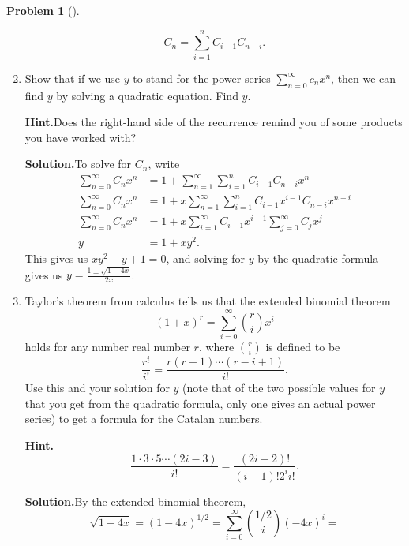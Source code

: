 \documentclass[10pt,]{book}
\theoremstyle{plain}
\theoremstyle{definition}
\newtheorem{activity}[project]{Problem}
\theoremstyle{definition}
\numberwithin{equation}{chapter}
\newcommand{\amp}{&}
\begin{document}
\begin{activity}[]
\begin{enumerate}[font=\bfseries,label=(\alph*),ref=\alph*]
\begin{equation*}
C_n=\sum_{i=1}^nC_{i-1}C_{n-i}\text{.}
\end{equation*}
%
\item\label{task-162} Show that if we use \(y\) to stand for the power series \(\sum_{n=0}^\infty c_nx^n\), then we can find \(y\) by solving a quadratic equation. Find \(y\).%
\par\medskip\noindent%
\textbf{Hint.}\quad Does the right-hand side of the recurrence remind you of some products you have worked with?%
\par\medskip\noindent%
\textbf{Solution.}\quad To solve for \(C_n\), write%
\begin{align*}
\sum_{n=0}^\infty C_nx^n \amp= 1+\sum_{n=1}^\infty\sum_{i=1}^nC_{i-1}C_{n-i}x^n\\
\sum_{n=0}^\infty C_nx^n
\amp= 1+x\sum_{n=1}^\infty\sum_{i=1}^nC_{i-1}x^{i-1}C_{n-i}x^{n-i}\\
\sum_{n=0}^\infty C_nx^n
\amp= 1+x\sum_{i=1}^\infty C_{i-1}x^{i-1}\sum_{j=0}^\infty C_{j}x^{j}\\
y \amp= 1 + xy^2\text{.}
\end{align*}
This gives us \(xy^2-y+1=0\), and solving for \(y\) by the quadratic formula gives us \(y=\frac{1\pm \sqrt{1-4x}}{2x}\).%
\item\label{task-163} Taylor's theorem from calculus tells us that the extended binomial theorem%
\begin{equation*}
(1+x)^r = \sum_{i=0}^\infty \binom{r}{i}x^i
\end{equation*}
holds for any number real number \(r\), where \(\binom{r}{i}\) is defined to be%
\begin{equation*}
\frac{r^{\underline{i}}}{i!} = \frac{r(r-1)\cdots(r-i+1)}{i!}  \text{.}
\end{equation*}
Use this and your solution for \(y\) (note that of the two possible values for \(y\) that you get from the quadratic formula, only one gives an actual power series) to get a formula for the Catalan numbers.%
\par\medskip\noindent%
\textbf{Hint.}\quad %
\begin{equation*}
\frac{1\cdot 3\cdot 5\cdots (2i-3)}{i!} = \frac{(2i-2)!}{(i-1)!2^i i!}\text{.}
\end{equation*}
%
\par\medskip\noindent%
\textbf{Solution.}\quad By the extended binomial theorem,%
\begin{equation*}
\sqrt{1-4x}=(1-4x)^{1/2} = \sum_{i=0}^\infty \binom{1/2}{i}(-4x)^i=

\end{equation*}
\end{enumerate}
\end{activity}
\end{document}
